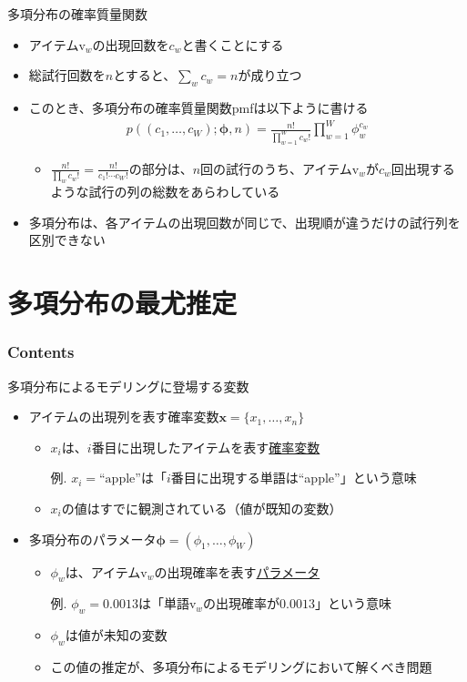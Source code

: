 \documentclass[aspectratio=169,unicode,dvipdfmx,14pt]{beamer}
\begin{document}
\begin{frame}{多項分布の確率質量関数}
\begin{itemize}
\item アイテム$\mbox{v}_w$の出現回数を$c_w$と書くことにする
\item 総試行回数を$n$とすると、$\sum_w c_w = n$が成り立つ
\item このとき、多項分布の確率質量関数pmfは以下ように書ける
\begin{align}
p((c_1,\ldots,c_W);\bm{\phi},n) = \frac{n!}{\prod_{w=1}^W c_w!}\prod_{w=1}^W \phi_w^{c_w}
\end{align}
\begin{itemize}
\item $\frac{n!}{\prod_w c_w!} = \frac{n!}{c_1!\cdots c_W!}$の部分は、$n$回の試行のうち、アイテム$\mbox{v}_w$が$c_w$回出現するような試行の列の総数をあらわしている
\end{itemize}
\item 多項分布は、各アイテムの出現回数が同じで、出現順が違うだけの試行列を区別できない
\end{itemize}
\end{frame}

\section{多項分布の最尤推定}

\begin{frame}\frametitle{Contents}
\Large \tableofcontents[currentsection]
\end{frame}

\begin{frame}{多項分布によるモデリングに登場する変数}
\begin{itemize}
\item アイテムの出現列を表す確率変数$\bm{x}=\{x_1,\ldots,x_n\}$
\begin{itemize}
\item $x_i$は、$i$番目に出現したアイテムを表す\underline{確率変数}
\item[例.] $x_i = \mbox{``apple''}$は「$i$番目に出現する単語は``apple''」という意味
\item $x_i$の値はすでに観測されている（値が既知の変数）
\end{itemize}
\item 多項分布のパラメータ$\bm{\phi}=(\phi_1,\ldots,\phi_W)$
\begin{itemize}
\item $\phi_w$は、アイテム$\mbox{v}_w$の出現確率を表す\underline{パラメータ}
\item[例.] $\phi_w=0.0013$は「単語$\mbox{v}_w$の出現確率が$0.0013$」という意味
\item $\phi_w$は値が未知の変数
\item この値の推定が、多項分布によるモデリングにおいて解くべき問題
\end{itemize}
\end{itemize}
\end{frame}
\end{document}
